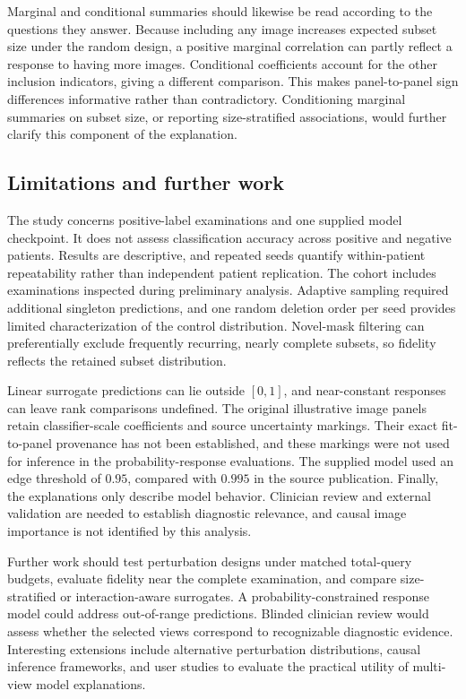 Marginal and conditional summaries should likewise be read according to the questions they answer. Because including any image increases expected subset size under the random design, a positive marginal correlation can partly reflect a response to having more images. Conditional coefficients account for the other inclusion indicators, giving a different comparison. This makes panel-to-panel sign differences informative rather than contradictory. Conditioning marginal summaries on subset size, or reporting size-stratified associations, would further clarify this component of the explanation.

\subsection{Limitations and further work}
The study concerns positive-label examinations and one supplied model checkpoint. It does not assess classification accuracy across positive and negative patients. Results are descriptive, and repeated seeds quantify within-patient repeatability rather than independent patient replication. The cohort includes examinations inspected during preliminary analysis. Adaptive sampling required additional singleton predictions, and one random deletion order per seed provides limited characterization of the control distribution. Novel-mask filtering can preferentially exclude frequently recurring, nearly complete subsets, so fidelity reflects the retained subset distribution.

Linear surrogate predictions can lie outside $[0,1]$, and near-constant responses can leave rank comparisons undefined. The original illustrative image panels retain classifier-scale coefficients and source uncertainty markings. Their exact fit-to-panel provenance has not been established, and these markings were not used for inference in the probability-response evaluations. The supplied model used an edge threshold of $0.95$, compared with $0.995$ in the source publication. Finally, the explanations only describe model behavior. Clinician review and external validation are needed to establish diagnostic relevance, and causal image importance is not identified by this analysis.

Further work should test perturbation designs under matched total-query budgets, evaluate fidelity near the complete examination, and compare size-stratified or interaction-aware surrogates. A probability-constrained response model could address out-of-range predictions. Blinded clinician review would assess whether the selected views correspond to recognizable diagnostic evidence. Interesting extensions include alternative perturbation distributions, causal inference frameworks, and user studies to evaluate the practical utility of multi-view model explanations.

